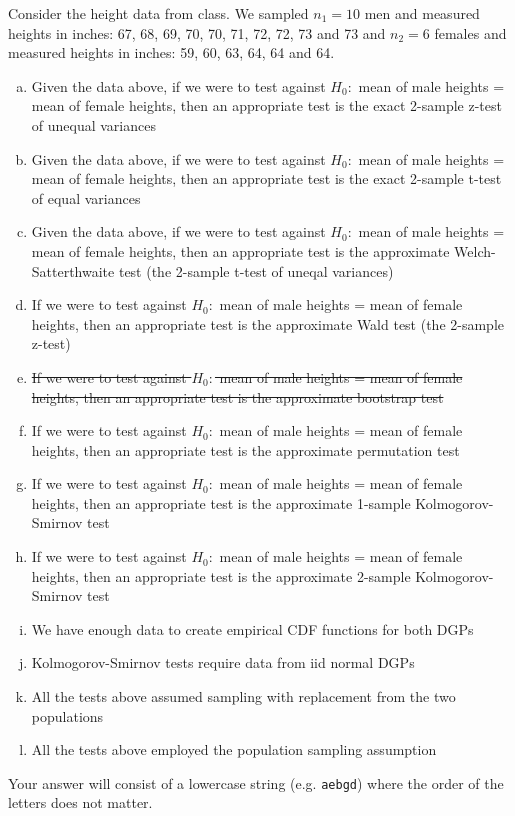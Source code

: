 \documentclass[12pt,landscape]{article}
\newcommand{\instr}{\small Your answer will consist of a lowercase string (e.g. \texttt{aebgd}) where the order of the letters does not matter. \normalsize}
\begin{document}

\problem{} Consider the height data from class. We sampled $n_1 = 10$ men and measured heights in inches: 67, 68, 69, 70, 70, 71, 72, 72, 73 and 73 and $n_2 = 6$ females and measured heights in inches: 59, 60, 63, 64, 64 and 64.

\vspace{-0.2cm}\benum{} 

\begin{enumerate}[(a)]
\item Given the data above, if we were to test against $H_0:$ mean of male heights = mean of female heights, then an appropriate test is the exact 2-sample z-test of unequal variances
\item Given the data above, if we were to test against $H_0:$ mean of male heights = mean of female heights, then an appropriate test is the exact 2-sample t-test of equal variances
\item Given the data above, if we were to test against $H_0:$ mean of male heights = mean of female heights, then an appropriate test is the approximate Welch-Satterthwaite test (the 2-sample t-test of uneqal variances)
\item If we were to test against $H_0:$ mean of male heights = mean of female heights, then an appropriate test is the approximate Wald test (the 2-sample z-test)
\item \sout{If we were to test against $H_0:$ mean of male heights = mean of female heights, then an appropriate test is the approximate bootstrap test} 
\item If we were to test against $H_0:$ mean of male heights = mean of female heights, then an appropriate test is the approximate permutation test
\item If we were to test against $H_0:$ mean of male heights = mean of female heights, then an appropriate test is the approximate 1-sample Kolmogorov-Smirnov test
\item If we were to test against $H_0:$ mean of male heights = mean of female heights, then an appropriate test is the approximate 2-sample Kolmogorov-Smirnov test
\item We have enough data to create empirical CDF functions for both DGPs
\item Kolmogorov-Smirnov tests require data from iid normal DGPs
\item All the tests above assumed sampling with replacement from the two populations
\item All the tests above employed the population sampling assumption
\end{enumerate}
\eenum\instr\pagebreak
\end{document}

